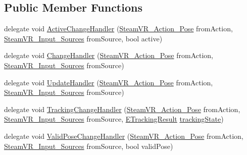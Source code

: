 \subsection*{Public Member Functions}
\begin{DoxyCompactItemize}
\item 
delegate void \mbox{\hyperlink{class_valve_1_1_v_r_1_1_steam_v_r___action___pose_a3861a4b4b8ce246db2cc77e632a7f999}{Active\+Change\+Handler}} (\mbox{\hyperlink{class_valve_1_1_v_r_1_1_steam_v_r___action___pose}{Steam\+V\+R\+\_\+\+Action\+\_\+\+Pose}} from\+Action, \mbox{\hyperlink{namespace_valve_1_1_v_r_a82e5bf501cc3aa155444ee3f0662853f}{Steam\+V\+R\+\_\+\+Input\+\_\+\+Sources}} from\+Source, bool active)
\item 
delegate void \mbox{\hyperlink{class_valve_1_1_v_r_1_1_steam_v_r___action___pose_ac9415e6ad971e70311f59ff1bfb4ea76}{Change\+Handler}} (\mbox{\hyperlink{class_valve_1_1_v_r_1_1_steam_v_r___action___pose}{Steam\+V\+R\+\_\+\+Action\+\_\+\+Pose}} from\+Action, \mbox{\hyperlink{namespace_valve_1_1_v_r_a82e5bf501cc3aa155444ee3f0662853f}{Steam\+V\+R\+\_\+\+Input\+\_\+\+Sources}} from\+Source)
\item 
delegate void \mbox{\hyperlink{class_valve_1_1_v_r_1_1_steam_v_r___action___pose_a243e7046a430c572e5be3d1b6b322b6d}{Update\+Handler}} (\mbox{\hyperlink{class_valve_1_1_v_r_1_1_steam_v_r___action___pose}{Steam\+V\+R\+\_\+\+Action\+\_\+\+Pose}} from\+Action, \mbox{\hyperlink{namespace_valve_1_1_v_r_a82e5bf501cc3aa155444ee3f0662853f}{Steam\+V\+R\+\_\+\+Input\+\_\+\+Sources}} from\+Source)
\item 
delegate void \mbox{\hyperlink{class_valve_1_1_v_r_1_1_steam_v_r___action___pose_a52e352705659c14685cf8a88ef4bafd6}{Tracking\+Change\+Handler}} (\mbox{\hyperlink{class_valve_1_1_v_r_1_1_steam_v_r___action___pose}{Steam\+V\+R\+\_\+\+Action\+\_\+\+Pose}} from\+Action, \mbox{\hyperlink{namespace_valve_1_1_v_r_a82e5bf501cc3aa155444ee3f0662853f}{Steam\+V\+R\+\_\+\+Input\+\_\+\+Sources}} from\+Source, \mbox{\hyperlink{namespace_valve_1_1_v_r_abe6feab98f33191b7c27b4292012e90a}{E\+Tracking\+Result}} \mbox{\hyperlink{class_valve_1_1_v_r_1_1_steam_v_r___action___pose___base_af04d371ae8e8552385b022d1aa788d32}{tracking\+State}})
\item 
delegate void \mbox{\hyperlink{class_valve_1_1_v_r_1_1_steam_v_r___action___pose_a742270a6bddfea2afd7f535378ae7830}{Valid\+Pose\+Change\+Handler}} (\mbox{\hyperlink{class_valve_1_1_v_r_1_1_steam_v_r___action___pose}{Steam\+V\+R\+\_\+\+Action\+\_\+\+Pose}} from\+Action, \mbox{\hyperlink{namespace_valve_1_1_v_r_a82e5bf501cc3aa155444ee3f0662853f}{Steam\+V\+R\+\_\+\+Input\+\_\+\+Sources}} from\+Source, bool valid\+Pose)

\end{DoxyCompactItemize}
